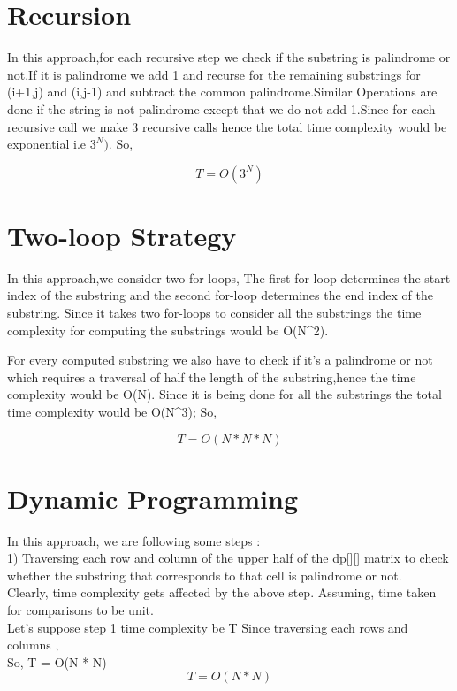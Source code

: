 \documentclass[conference]{IEEEtran}
\begin{document}
\section*{Recursion}

In this approach,for each recursive step we check if the substring is palindrome or not.If it is palindrome we add 1 and recurse for the remaining substrings for 
(i+1,j) and (i,j-1) and subtract the common palindrome.Similar Operations are done if the string is not palindrome except that we do not add 1.Since for each recursive call we make 3 recursive calls hence the total time complexity would be exponential i.e \( 3^N) \).
So,

\[T=O(3^N)\]
     

\bigskip

\section*{Two-loop Strategy}


In this approach,we consider two for-loops,
The first for-loop determines the start index of the substring and the second for-loop determines the end index of the substring.
Since it takes two for-loops to consider all the substrings the time complexity for computing the substrings would be O(N^2).

For every computed substring we also have to check if it’s a palindrome or not which requires a traversal of half the length of the substring,hence the time complexity would be O(N).
Since it is being done for all the substrings the total time complexity would be O(N^3);\bigskip
So,

 \[T=O(N*N*N)\]

\bigskip
\section*{Dynamic Programming}


In this approach, we are following some steps :\\
1) Traversing each row and column  of the upper half of the dp[][] matrix to check whether the substring that corresponds to that cell is palindrome or not.\\

Clearly, time complexity gets affected by the above step.
Assuming, time taken for comparisons to be  unit.\\
Let's suppose step 1 time complexity be T Since traversing each rows and columns ,\\
So, T = O(N * N) \\
\[T =  O(N*N)\]
\end{document}
